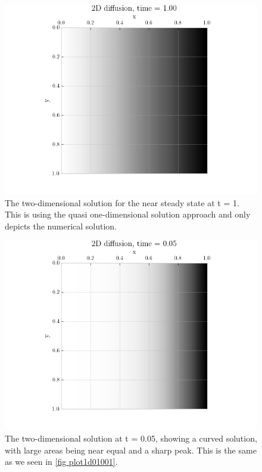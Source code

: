 \documentclass[%
reprint,
nofootinbib,
amsmath,amssymb,
aps,
]{revtex4-1}
\begin{document}
\begin{figure}
	\centering
	\includegraphics[width=0.95\linewidth]{./figures/2D1.png}
	\caption{The two-dimensional solution for the near steady state at t = 1. This is using the quasi one-dimensional solution approach and only depicts the numerical solution.}
	\label{fig 2d1}
\end{figure}
\begin{figure}
	\centering
	\includegraphics[width=0.95\linewidth]{./figures/2D2.png}
	\caption{The two-dimensional solution at t = 0.05, showing a curved solution, with large areas being near equal and a sharp peak. This is the same as we seen in \autoref{fig plot1d01001}.}
	\label{fig 2d4}
\end{figure}
\end{document}
